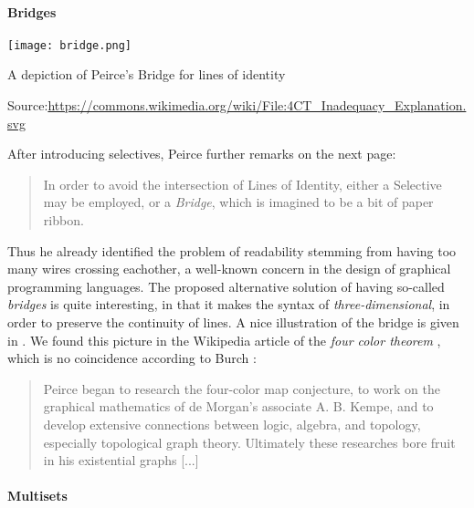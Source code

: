 \begin{scope}
\begin{scope}
\paragraph{Bridges} 

\begin{marginfigure}
  \texttt{[image: bridge.png]}
  \caption{A depiction of Peirce's Bridge for lines of identity}
  \footnotesize Source:\hspace{3pt}\url{https://commons.wikimedia.org/wiki/File:4CT_Inadequacy_Explanation.svg}
\end{marginfigure}

After introducing selectives, Peirce further remarks on the next page:
\begin{quote}
  In order to avoid the intersection of Lines of Identity, either a Selective
may be employed, or a \emph{Bridge}, which is imagined to be a bit of paper
ribbon.
\end{quote}
Thus he already identified the problem of readability stemming from having too
many wires crossing eachother, a well-known concern in the design of graphical
programming languages. The proposed
alternative solution of having so-called \emph{bridges} is quite interesting, in
that it makes the syntax of  \emph{three-dimensional}, in order to preserve
the continuity of lines. A nice illustration of the bridge is given in
. We found this picture in the Wikipedia article of the
\emph{four color theorem} \cite{noauthor_four_2023}, which is no coincidence
according to Burch \cite{sep-peirce}:
\begin{quote}
  Peirce began to research the four-color map conjecture, to work on the
graphical mathematics of de Morgan's associate A. B. Kempe, and to develop
extensive connections between logic, algebra, and topology, especially
topological graph theory. Ultimately these researches bore fruit in his
existential graphs [...]
\end{quote}

\paragraph{Multisets}


\end{scope}
\end{scope}
